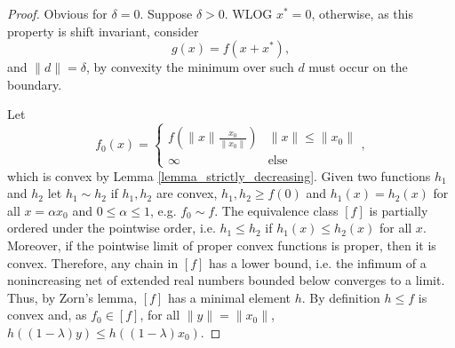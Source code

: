 \documentclass[10pt,a4paper]{amsart}
\begin{document}
\begin{proof}
Obvious for $\delta = 0$.
Suppose $\delta > 0$.
WLOG $x^{\ast} = 0$, otherwise, as this property is shift invariant, consider
\begin{equation*}
g(x) = f(x+x^{\ast}),
\end{equation*}
and $\lVert d \rVert = \delta$, by convexity the minimum over such $d$ must occur on the boundary.

Let
\begin{equation*}
f_{0}(x)
=
\begin{cases}
f\left( \lVert x \rVert \frac{ x_{0} }{\lVert x_{0} \rVert } \right) & \lVert x \rVert \le \lVert x_{0} \rVert \\
\infty & \text{else}
\end{cases},
\end{equation*}
which is convex by Lemma \ref{lemma_strictly_decreasing}.
Given two functions $h_{1}$ and $h_{2}$ let $h_{1} \sim h_{2}$ if $h_{1},h_{2}$ are convex, $h_{1},h_{2} \ge f(0)$ and $h_{1}(x) = h_{2}(x)$ for all $x = \alpha x_{0}$ and $0 \le \alpha \le 1$, e.g. $f_{0} \sim f$.
The equivalence class $[f]$ is partially ordered under the pointwise order, i.e. $h_{1} \le h_{2}$ if $h_{1}(x) \le h_{2}(x)$ for all $x$.
Moreover, if the pointwise limit of proper convex functions is proper, then it is convex.
Therefore, any chain in $[f]$ has a lower bound, i.e. the infimum of a nonincreasing net of extended real numbers bounded below converges to a limit.
Thus, by Zorn's lemma, $[f]$ has a minimal element $h$.
By definition $h \le f$ is convex and, as $f_{0} \in [f]$, for all $\lVert y \rVert = \lVert x_{0} \rVert$, $h((1-\lambda)y) \le h((1-\lambda)x_{0})$.


\end{proof}
\end{document}
